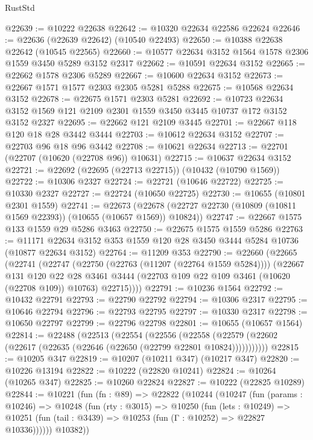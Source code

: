 \begin{lexlean}{RustStd}
\begin{coremodule}
@22639 := @10222 @22638
@22642 := @10320 @22634 @22586 @22624
@22646 := @22636 (@22639 @22642) (@10540 @22493)
@22650 := @10388 @22638 @22642 (@10545 @22565)
@22660 := @10577 @22634 @3152 @1564 @1578 @2306 @1559 @3450 @5289 @3152 @2317
@22662 := @10591 @22634 @3152
@22665 := @22662 @1578 @2306 @5289
@22667 := @10600 @22634 @3152
@22673 := @22667 @1571 @1577 @2303 @2305 @5281 @5288
@22675 := @10568 @22634 @3152
@22678 := @22675 @1571 @2303 @5281
@22692 := @10723 @22634 @3152 @1569 @121 @2109 @2301 @1559 @3450 @3445 @10737 @172 @3152 @3152 @2327
@22695 := @22662 @121 @2109 @3445
@22701 := @22667 @118 @120 @18 @28 @3442 @3444
@22703 := @10612 @22634 @3152
@22707 := @22703 @96 @18 @96 @3442
@22708 := @10621 @22634
@22713 := @22701 (@22707 (@10620 (@22708 @96)) @10631)
@22715 := @10637 @22634 @3152
@22721 := @22692 (@22695 (@22713 @22715)) (@10432 (@10790 @1569))
@22722 := @10306 @2327
@22724 := @22721 (@10646 @22722)
@22725 := @10330 @2327
@22727 := @22724 (@10650 @22725)
@22730 := @10655 (@10801 @2301 @1559)
@22741 := @22673
    (@22678 (@22727 @22730 (@10809 (@10811 @1569 @22393)) (@10655 (@10657 @1569)) @10824))
@22747 := @22667 @1575 @133 @1559 @29 @5286 @3463
@22750 := @22675 @1575 @1559 @5286
@22763 := @11171 @22634 @3152 @353 @1559 @120 @28 @3450 @3444 @5284 @10736 (@10877 @22634 @3152)
@22764 := @11209 @353
@22790 := @22660
    (@22665
      (@22741
        (@22747
          (@22750 (@22763 (@11207 (@22764 @1559 @5284))))
          (@22667
            @131
            @120
            @22
            @28
            @3461
            @3444
            (@22703 @109 @22 @109 @3461 (@10620 (@22708 @109)) @10763)
            @22715))))
@22791 := @10236 @1564
@22792 := @10432 @22791
@22793 := @22790 @22792
@22794 := @10306 @2317
@22795 := @10646 @22794
@22796 := @22793 @22795
@22797 := @10330 @2317
@22798 := @10650 @22797
@22799 := @22796 @22798
@22801 := @10655 (@10657 @1564)
@22814 := @22488
    (@22513
      (@22554
        (@22556
          (@22558 (@22579 (@22602 (@22617 (@22635 (@22646 (@22650 (@22799 @22801 @10824)))))))))))
@22815 := @10205 @347
@22819 := @10207 (@10211 @347) (@10217 @347)
@22820 := @10226 @13194
@22822 := @10222 (@22820 @10241)
@22824 := @10264 (@10265 @347)
@22825 := @10260 @22824
@22827 := @10222 (@22825 @10289)
@22844 := @10221
    (fun (fn : @89) =>
    @22822
      (@10244
        (@10247
          (fun (params : @10246) =>
          @10248
            (fun (rty : @3015) =>
            @10250
              (fun (lets : @10249) =>
              @10251 (fun (tail : @3439) => @10253 (fun (Γ : @10252) => @22827 @10336))))))
        @10382))

\end{coremodule}
\end{lexlean}
